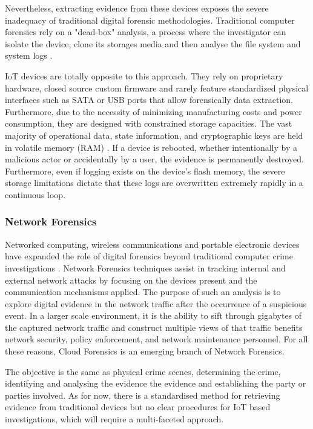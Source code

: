 Nevertheless, extracting evidence from these devices exposes the severe inadequacy of traditional digital forensic methodologies. Traditional computer forensics rely on a "dead-box" analysis, a process where the investigator can isolate the device, clone its storages media and then analyse the file system and system logs \cite{NISTSP80086}.

IoT devices are totally opposite to this approach. They rely on proprietary hardware, closed source custom firmware and rarely feature standardized physical interfaces such as SATA or USB ports that allow forensically data extraction. Furthermore, due to the necessity of minimizing manufacturing costs and power consumption, they are designed with constrained storage capacities. The vast majority of operational data, state information, and cryptographic keys are held in volatile memory (RAM) \cite{Alenezi2025}. If a device is rebooted, whether intentionally by a malicious actor or accidentally by a user, the evidence is permanently destroyed. Furthermore, even if logging exists on the device's flash memory, the severe storage limitations dictate that these logs are overwritten extremely rapidly in a continuous loop.

\subsubsection{Network Forensics}

Networked computing, wireless communications and portable electronic devices have expanded the role of digital forensics beyond traditional computer crime investigations  \cite{MacDermot2020}. Network Forensics  techniques  assist  in tracking internal  and external  network  attacks  by focusing on the devices present and the communication mechanisms applied. The purpose of such an analysis is to explore digital evidence in the network traffic after the occurrence of a suspicious event. In a larger scale environment, it is the ability to sift through gigabytes of the captured network traffic and construct multiple views of that traffic benefits network security, policy enforcement, and network maintenance personnel. For all these reasons, Cloud Forensics is an emerging branch of Network Forensics.

The objective is the same as physical crime scenes, determining the crime, identifying and analysing the evidence the evidence and establishing the party or parties involved. As for now, there is a standardised method for retrieving evidence from traditional devices but no clear procedures for IoT based investigations, which will require a multi-faceted approach. 

